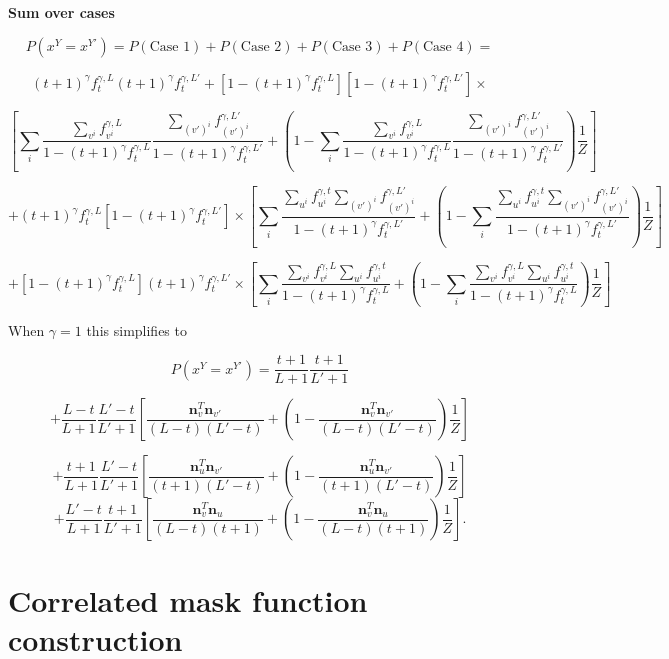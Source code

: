 \documentclass{article}
\begin{document}
\begin{appendices}
\textbf{Sum over cases}

$$P(x^Y = x^{Y'}) = P(\textrm{Case 1}) + P(\textrm{Case 2}) + P(\textrm{Case 3}) + P(\textrm{Case 4}) = $$

$$
(t+1)^\gamma f^{\gamma,L}_t(t+1)^\gamma f^{\gamma,L'}_t + [1 - (t+1)^\gamma f^{\gamma,L}_t][1 - (t+1)^\gamma f^{\gamma,L'}_t] \times$$

$$\left[
\sum_i \frac{\sum\limits_{v^i} f^{\gamma,L}_{v^i}}{1 - (t+1)^\gamma f^{\gamma,L}_t} \frac{\sum\limits_{(v')^i} f^{\gamma,L'}_{(v')^i}}{1 - (t+1)^\gamma f^{\gamma,L'}_t} + \left(1 - \sum_i \frac{\sum\limits_{v^i} f^{\gamma,L}_{v^i}}{1 - (t+1)^\gamma f^{\gamma,L}_t} \frac{\sum\limits_{(v')^i} f^{\gamma,L'}_{(v')^i}}{1 - (t+1)^\gamma f^{\gamma,L'}_t}\right)\frac{1}{Z}
\right]$$

$$+(t+1)^\gamma f^{\gamma,L}_t[1-(t+1)^\gamma f^{\gamma,L'}_t] \times 
\left[
\sum_i \frac{\sum\limits_{u^i} f_{u^i}^{\gamma, t} \sum\limits_{(v')^i} f_{(v')^i}^{\gamma,L'}}{1 - (t+1)^\gamma f^{\gamma,L'}_t} 
+ \left(1 - \sum_i \frac{\sum\limits_{u^i} f_{u^i}^{\gamma, t} \sum\limits_{(v')^i} f_{(v')^i}^{\gamma,L'}}{1 - (t+1)^\gamma f^{\gamma,L'}_t}\right)\frac{1}{Z}
\right]
$$

$$+[1 - (t+1)^\gamma f^{\gamma,L}_t](t+1)^\gamma f^{\gamma,L'}_t \times \left[
\sum_i \frac{\sum\limits_{v^i} f_{v^i}^{\gamma,L}\sum\limits_{u^i} f_{u^i}^{\gamma, t}}{1 - (t+1)^\gamma f^{\gamma,L}_t} 
+ \left(1 - \sum_i \frac{\sum\limits_{v^i} f_{v^i}^{\gamma,L}\sum\limits_{u^i} f_{u^i}^{\gamma, t}}{1 - (t+1)^\gamma f^{\gamma,L}_t}\right)\frac{1}{Z}
\right]
$$

When $\gamma = 1$ this simplifies to

$$P(x^Y = x^{Y'}) =  \frac{t+1}{L+1}\frac{t+1}{L'+1}$$

$$
+ \frac{L-t}{L+1}\frac{L'-t}{L'+1}\left[\frac{\mathbf{n}^T_v\mathbf{n}_{v'}}{(L-t)(L'-t)} + \left(1 - \frac{\mathbf{n}^T_v\mathbf{n}_{v'}}{(L-t)(L'-t)} \right)\frac{1}{Z}\right]
$$

$$+\frac{t+1}{L+1}\frac{L'-t}{L'+1}\left[
\frac{\mathbf{n}^T_{u}\mathbf{n}_{v'}}{(t+1)(L'-t)}+ \left(1 - \frac{\mathbf{n}^T_{u}\mathbf{n}_{v'}}{(t+1)(L'-t)} \right)\frac{1}{Z}
\right]$$
$$
+\frac{L'-t}{L+1}\frac{t+1}{L'+1}\left[
\frac{\mathbf{n}^T_{v}\mathbf{n}_{u}}{(L-t)(t+1)} + \left(1 - \frac{\mathbf{n}^T_{v}\mathbf{n}_{u}}{(L-t)(t+1)} \right)\frac{1}{Z}
\right].
$$

\section{Correlated mask function construction}


\end{appendices}
\end{document}
